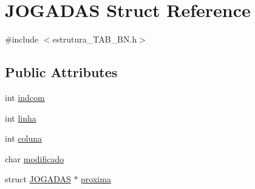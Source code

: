 \hypertarget{structJOGADAS}{\section{J\-O\-G\-A\-D\-A\-S Struct Reference}
\label{structJOGADAS}
}


{\ttfamily \#include $<$estrutura\-\_\-\-T\-A\-B\-\_\-\-B\-N.\-h$>$}

\subsection*{Public Attributes}
\begin{DoxyCompactItemize}
\item 
int \hyperlink{structJOGADAS_a206a51faab310b88ead47ae8bd45c005}{indcom}
\item 
int \hyperlink{structJOGADAS_a967eba2150e21971402055c08864f81e}{linha}
\item 
int \hyperlink{structJOGADAS_a28827d11a796524d7c3f836a34a9b28c}{coluna}
\item 
char \hyperlink{structJOGADAS_a66f982d3f9fb083c8289819db4e1f892}{modificado}
\item 
struct \hyperlink{structJOGADAS}{J\-O\-G\-A\-D\-A\-S} $\ast$ \hyperlink{structJOGADAS_a5e94fadbce9d65532b484d6d36bbce7d}{proxima}
\end{DoxyCompactItemize}


